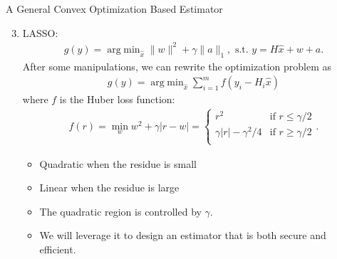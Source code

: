 \documentclass[10pt]{beamer}
\DeclareMathOperator{\argmin}{arg\;min}
\begin{document}
\begin{frame}{A General Convex Optimization Based Estimator}
  \begin{enumerate}  \setcounter{enumi}{2}
  \item LASSO:
    \begin{align*}
      g(y) = \argmin_{\hat x} \|w\|^2+\gamma \|a\|_1, \text{ s.t. }y=H\hat x+w+a.
    \end{align*}
    After some manipulations, we can rewrite the optimization problem as
    \begin{align*}
      g(y) = \argmin_{\hat x} \sum_{i=1}^m f(y_i-H_i\hat x)
    \end{align*}
    where $f$ is the Huber loss function:
    \begin{align*}
      f(r) = \min_{w} w^2 + \gamma |r-w| = \begin{cases}
        r^2 & \text{if } r \leq \gamma/2\\
        \gamma |r|-\gamma^2/4 & \text{if } r\geq \gamma/2\\
      \end{cases}.
    \end{align*}
    \begin{itemize}
    \item Quadratic when the residue is small
    \item Linear when the residue is large
    \item The quadratic region is controlled by $\gamma$.
    \item We will leverage it to design an estimator that is both secure and efficient.
    \end{itemize}
  \end{enumerate}
\end{frame}
\end{document}

